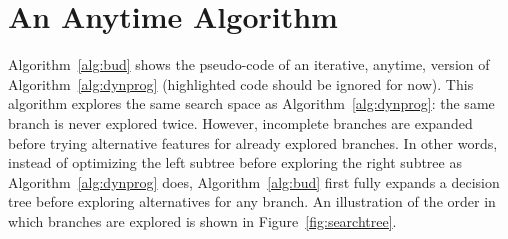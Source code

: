 \documentclass{llncs}
\begin{document}




\section{An Anytime Algorithm}

Algorithm~\ref{alg:bud} shows the pseudo-code of an iterative, anytime, version of Algorithm~\ref{alg:dynprog} (highlighted code should be ignored for now). This algorithm
explores the same search space as Algorithm~\ref{alg:dynprog}: the same branch is never explored twice. However, incomplete branches are expanded before trying alternative features for already explored branches. In other words, instead of optimizing the left subtree before exploring the right subtree as Algorithm~\ref{alg:dynprog} does, Algorithm~\ref{alg:bud} first fully expands a decision tree before exploring alternatives for any branch. An illustration of the order in which branches are explored is shown in Figure~\ref{fig:searchtree}.
\end{document}
